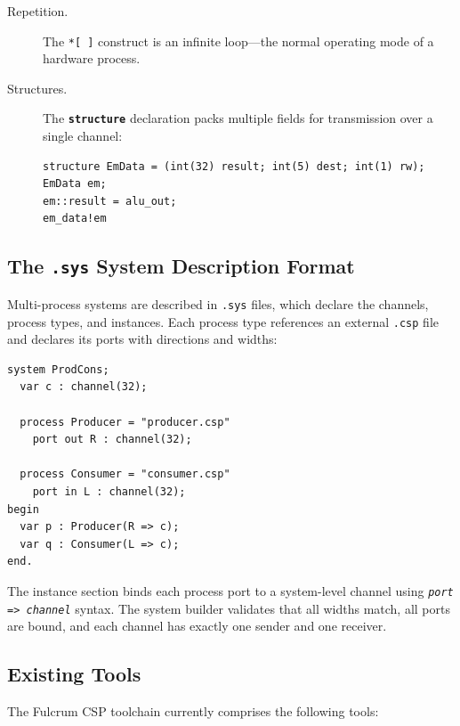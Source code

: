 \documentclass[11pt]{article}
\newcommand{\keyword}[1]{\texttt{\textbf{#1}}}
\newcommand{\nonterminal}[1]{\textit{#1}}
\begin{document}
\begin{description}
\item[Repetition.]
  The \texttt{*[\,]} construct is an infinite loop---the normal
  operating mode of a hardware process.

\item[Structures.]
  The \keyword{structure} declaration packs multiple fields for
  transmission over a single channel:
\begin{Verbatim}[samepage=true]
structure EmData = (int(32) result; int(5) dest; int(1) rw);
EmData em;
em::result = alu_out;
em_data!em
\end{Verbatim}
\end{description}

\subsection{The \texttt{.sys} System Description Format}

Multi-process systems are described in \texttt{.sys} files, which
declare the channels, process types, and instances.  Each process type
references an external \texttt{.csp} file and declares its ports with
directions and widths:

\begin{Verbatim}[samepage=true]
system ProdCons;
  var c : channel(32);

  process Producer = "producer.csp"
    port out R : channel(32);

  process Consumer = "consumer.csp"
    port in L : channel(32);
begin
  var p : Producer(R => c);
  var q : Consumer(L => c);
end.
\end{Verbatim}

The instance section binds each process port to a system-level
channel using \texttt{\nonterminal{port} => \nonterminal{channel}}
syntax.  The system builder validates that all widths match, all ports
are bound, and each channel has exactly one sender and one receiver.

\subsection{Existing Tools}

The Fulcrum CSP toolchain currently comprises the following tools:
\end{document}

